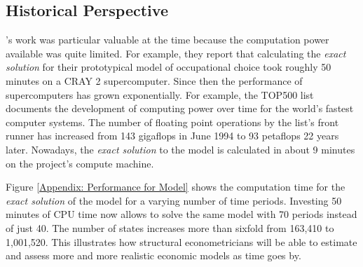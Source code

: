 \subsection{Historical Perspective}\label{Appendix: Historical Perspective}
\citet{Keane.1994}'s work was particular valuable at the time because the computation power available was quite limited. For example, they report that calculating the \textit{exact solution} for their prototypical model of occupational choice took roughly 50 minutes on a CRAY 2 supercomputer. Since then the performance of supercomputers has grown exponentially. For example, the TOP500 \citep{TOP500.2017} list documents the development of computing power over time for the world's fastest computer systems. The number of floating point operations by the list's front runner has increased from 143 gigaflops in June 1994 to 93 petaflops 22 years later. Nowadays, the \textit{exact solution} to the model is calculated in about 9 minutes on the project's compute machine.
%

%
Figure \ref{Appendix: Performance for Model} shows the computation time for the \textit{exact solution} of the model for a varying number of time periods. Investing 50 minutes of CPU time now allows to solve the same model with 70 periods instead of just 40. The number of states increases more than sixfold from 163,410 to 1,001,520. This illustrates how structural econometricians will be able to estimate and assess more and more realistic economic models as time goes by.
